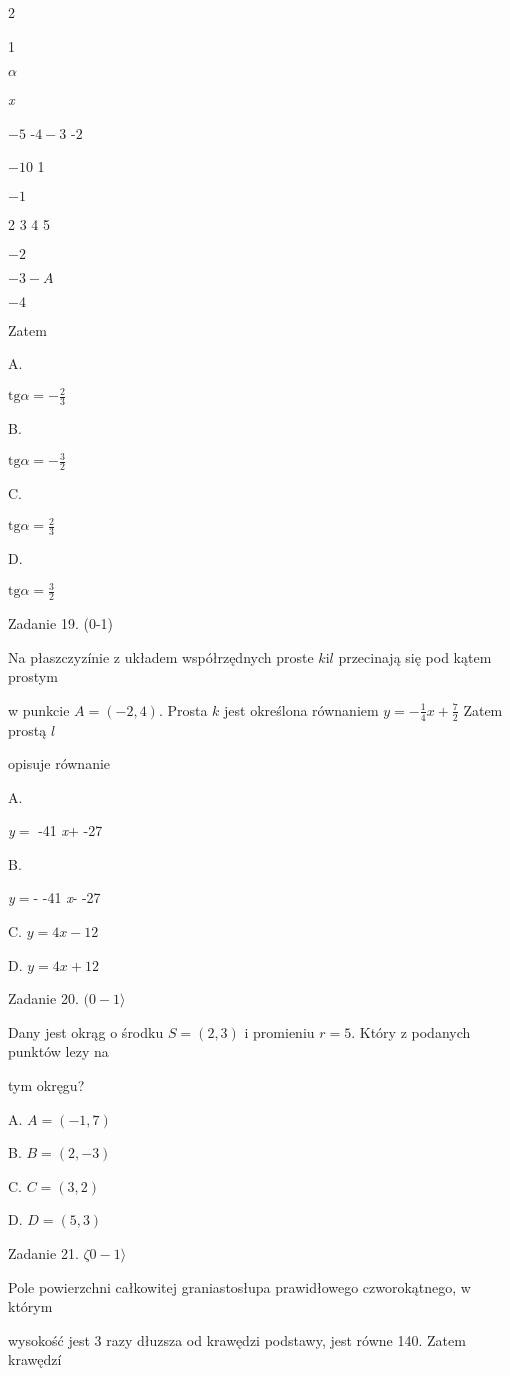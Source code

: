 \documentclass[a4paper,12pt]{article}
\begin{document}
2

1

$\alpha$

{\it x}

$-5$ -$4  -3$ -$2$

$-1 0$ 1

$-1$

2 3  4 5

$-2$

$-3  -A$

$-4$

Zatem

A.

$\displaystyle \mathrm{t}\mathrm{g}\alpha=-\frac{2}{3}$

B.

$\displaystyle \mathrm{t}\mathrm{g}\alpha=-\frac{3}{2}$

C.

$\displaystyle \mathrm{t}\mathrm{g}\alpha=\frac{2}{3}$

D.

$\displaystyle \mathrm{t}\mathrm{g}\alpha=\frac{3}{2}$

Zadanie 19. (0-1)

Na płaszczyzínie z układem współrzędnych proste $k\mathrm{i} l$ przecinają się pod kątem prostym

w punkcie $A=(-2,4)$. Prosta $k$ jest określona równaniem $y=-\displaystyle \frac{1}{4}x+\frac{7}{2}$ Zatem prostą $l$

opisuje równanie

A.

{\it y}$=$ -41 {\it x}$+$ -27

B.

{\it y}$=$- -41 {\it x}- -27

C. $y=4x-12$

D. $y=4x+12$

Zadanie 20. $(0-1\rangle$

Dany jest okrąg o środku $S=(2,3)$ i promieniu $r=5$. Który z podanych punktów lezy na

tym okręgu?

A. $A=(-1,7)$

B. $B=(2,-3)$

C. $C=(3,2)$

D. $D=(5,3)$

Zadanie 21. $\zeta 0-1\rangle$

Pole powierzchni całkowitej graniastosłupa prawidłowego czworokątnego, w którym

wysokość jest 3 razy dłuzsza od krawędzi podstawy, jest równe 140. Zatem krawędzí
\end{document}
